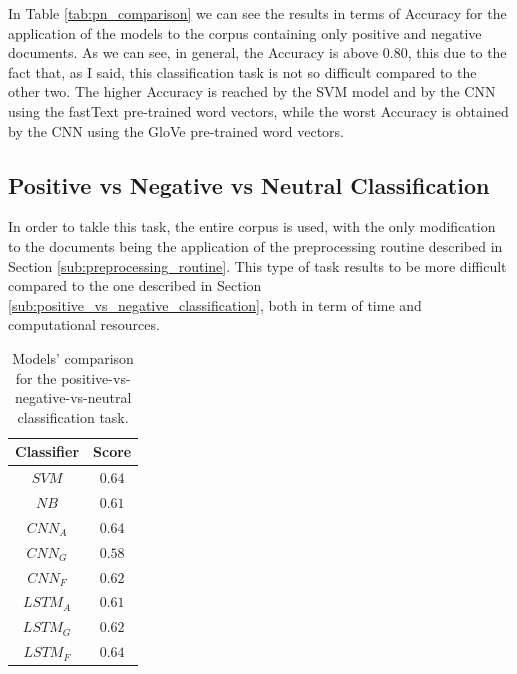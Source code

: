 \documentclass[11pt,twocolumn]{article}
\begin{document}
            \noindent
            In Table \ref{tab:pn_comparison} we can see the results in terms of Accuracy for the application
            of the models to the corpus containing only positive and negative documents. As we can see, in
            general, the Accuracy is above $0.80$, this due to the fact that, as I said, this
            classification task is not so difficult compared to the other two. The higher Accuracy is
            reached by the SVM model and by the CNN using the fastText pre-trained word vectors, while the
            worst Accuracy is obtained by the CNN using the GloVe pre-trained word vectors.

        \subsection{Positive vs Negative vs Neutral Classification} %
        \label{sub:positive_vs_negative_vs_neutral_classification}
            In order to takle this task, the entire corpus is used, with the only modification to the
            documents being the application of the preprocessing routine described in Section
            \ref{sub:preprocessing_routine}. This type of task results to be more difficult compared to
            the one described in Section \ref{sub:positive_vs_negative_classification}, both in term of
            time and computational resources.

            \begin{table}[h]
                \centering
                \begin{tabular}{| c | c |}
                    \hline
                    \textbf{Classifier} & \textbf{Score} \\
                    \hline
                    $SVM$ & $0.64$ \\
                    \hline
                    $NB$ & $0.61$ \\
                    \hline
                    $CNN_A$ & $0.64$ \\
                    \hline
                    $CNN_G$ & $0.58$ \\
                    \hline
                    $CNN_F$ & $0.62$ \\
                    \hline
                    $LSTM_A$ & $0.61$ \\
                    \hline
                    $LSTM_G$ & $0.62$ \\
                    \hline
                    $LSTM_F$ & $0.64$ \\
                    \hline
                \end{tabular}
                \caption{Models' comparison for the positive-vs-negative-vs-neutral classification task.}
                \label{tab:a_comparison}
            \end{table}
\end{document}
